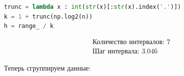 \documentclass[a4paper, 14pt]{extarticle}
\begin{document}
\vspace{10pt}

\begin{center}
  \begin{lstlisting}[language=Python]
trunc = lambda x : int(str(x)[:str(x).index('.')])
k = 1 + trunc(np.log2(n))
h = range_ / k
  \end{lstlisting}
\end{center}

\vspace{-5pt}

\begin{align*}
    & \text{Количество интервалов: } 7 \\
    & \text{Шаг интервала: }  3.046
\end{align*}

Теперь сгруппируем данные:

\vspace{10pt}
\end{document}
